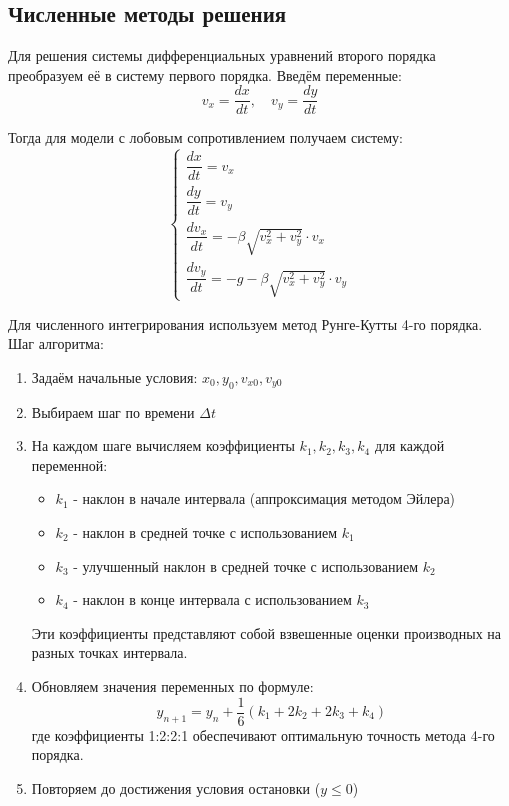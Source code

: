\begin{center}
    \section{Численные методы решения}
\end{center}

Для решения системы дифференциальных уравнений второго порядка преобразуем её в систему первого порядка. Введём переменные:
\[
v_x = \frac{dx}{dt}, \quad v_y = \frac{dy}{dt}
\]

Тогда для модели с лобовым сопротивлением получаем систему:
\[
\begin{cases}
\dfrac{dx}{dt} = v_x \\[1em]
\dfrac{dy}{dt} = v_y \\[1em]
\dfrac{dv_x}{dt} = -\beta \sqrt{v_x^2 + v_y^2} \cdot v_x \\[1em]
\dfrac{dv_y}{dt} = -g - \beta \sqrt{v_x^2 + v_y^2} \cdot v_y
\end{cases}
\]

Для численного интегрирования используем метод Рунге-Кутты 4-го порядка. Шаг алгоритма:
\begin{enumerate}
    \item Задаём начальные условия: $x_0, y_0, v_{x0}, v_{y0}$
    \item Выбираем шаг по времени $\Delta t$
    \item На каждом шаге вычисляем коэффициенты $k_1, k_2, k_3, k_4$ для каждой переменной:
    \begin{itemize}
        \item $k_1$ - наклон в начале интервала (аппроксимация методом Эйлера)
        \item $k_2$ - наклон в средней точке с использованием $k_1$
        \item $k_3$ - улучшенный наклон в средней точке с использованием $k_2$  
        \item $k_4$ - наклон в конце интервала с использованием $k_3$
    \end{itemize}
    Эти коэффициенты представляют собой взвешенные оценки производных на разных точках интервала.
    \item Обновляем значения переменных по формуле:
    \[
    y_{n+1} = y_n + \dfrac{1}{6}(k_1 + 2k_2 + 2k_3 + k_4)
    \]
    где коэффициенты 1:2:2:1 обеспечивают оптимальную точность метода 4-го порядка.
    \item Повторяем до достижения условия остановки ($y \leq 0$)
\end{enumerate}

\newpage
